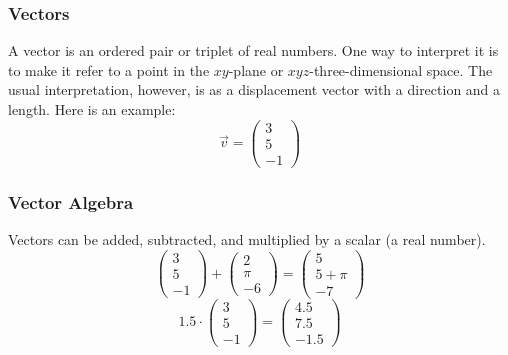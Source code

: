\documentclass[xcolor=dvipsnames]{beamer}
\begin{document}
\begin{frame}
  \frametitle{Vectors}
  A vector is an ordered pair or triplet of real numbers. One way to interpret it
  is to make it refer to a point in the $xy$-plane or
  $xyz$-three-dimensional space. The usual interpretation, however, is
  as a \alert{displacement vector} with a direction and a length. Here
  is an example:
  \begin{equation}
    \label{eq:lapheeka}
    \vec{v}=\left(
    \begin{array}{c}
      3 \\
      5 \\
      -1
    \end{array}\right)
  \end{equation}
\end{frame}

\begin{frame}
  \frametitle{Vector Algebra}
  Vectors can be added, subtracted, and multiplied by a scalar (a real
  number).
  \begin{equation}
    \label{eq:kaepuema}
    \left(
    \begin{array}{c}
      3 \\
      5 \\
      -1
    \end{array}\right)+
  \left(
    \begin{array}{c}
      2 \\
      \pi \\
      -6
    \end{array}\right)=
  \left(
    \begin{array}{c}
      5 \\
      5+\pi \\
      -7
    \end{array}\right)
  \end{equation}
  \begin{equation}
    \label{eq:kemodaim}
    1.5\cdot\left(
    \begin{array}{c}
      3 \\
      5 \\
      -1
    \end{array}\right)=
  \left(
    \begin{array}{c}
      4.5 \\
      7.5 \\
      -1.5
    \end{array}\right)
  \end{equation}
\end{frame}
\end{document}
